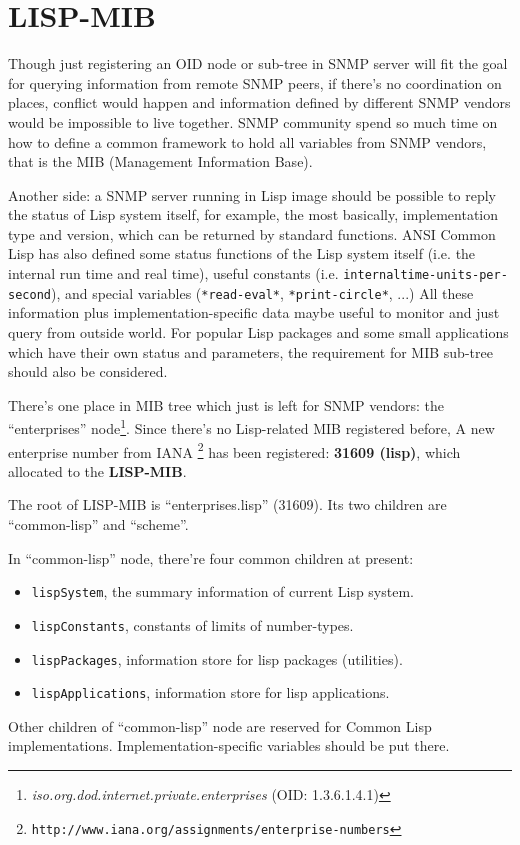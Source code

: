 \documentclass[reprint,9pt]{sigplanconf}
\begin{document}
\section{LISP-MIB}

Though just registering an OID node or sub-tree in SNMP server will
fit the goal for querying information from remote SNMP peers, if there's
no coordination on places, conflict would happen and information
defined by different SNMP vendors would be impossible to live
together. SNMP community spend so much time on how to define a common
framework to hold all variables from SNMP
vendors, that is the MIB (Management Information Base)\cite{RFC:3418}.

Another side: a SNMP server running in Lisp image should be possible
to reply the status of Lisp system itself, for example, the most
basically, implementation type and version, which can be returned by
standard functions. ANSI Common Lisp has also defined some status
functions of the Lisp system itself (i.e. the internal run time and
real time), useful constants
(i.e. \texttt{internal\-time-\-units-\-per\--second}), and special variables
(\texttt{*read-\-eval*}, \texttt{*print-\-circle*}, ...) All these
information plus implementation-specific data maybe useful to monitor
and just query from outside world. For popular Lisp packages and some
small applications which have their own status and parameters, the
requirement for MIB sub-tree should also be considered.

There's one place in MIB tree which just is left for SNMP vendors: the
``enterprises''
node\footnote{\textsl{iso.org.dod.internet.private.enterprises} (OID:
  1.3.6.1.4.1)}. Since there's no Lisp-related MIB registered before,
A new enterprise number from IANA
\footnote{\texttt{http://www.iana.org/assignments/enterprise-numbers}}
has been registered: \textbf{31609 (lisp)},
which allocated to the \textbf{LISP-MIB}.

The root of LISP-MIB is ``enterprises.lisp'' (31609). Its two children
are ``common-lisp'' and ``scheme''.

In ``common-lisp'' node, there're four common children at present:
\begin{itemize}
\item \texttt{lispSystem}, the summary information of current Lisp
  system.
\item \texttt{lispConstants}, constants of limits of number-types.
\item \texttt{lispPackages}, information store for lisp packages
  (utilities).
\item \texttt{lispApplications}, information store for lisp
  applications.
\end{itemize}
Other children of ``common-lisp'' node are reserved for Common Lisp
implementations.  Implementation-specific variables should be put
there.
\end{document}
